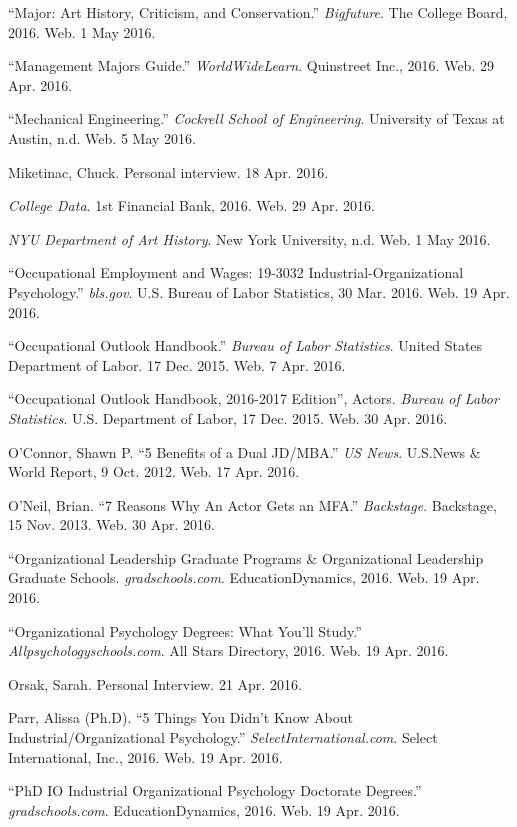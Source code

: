 \begin{workscited}
\begin{flushleft}
\bibent
“Major: Art History, Criticism, and Conservation.” \textit{Bigfuture}. The College Board, 2016. Web. 1 May 2016.

\bibent
“Management Majors Guide.” \textit{WorldWideLearn}. Quinstreet Inc., 2016. Web. 29 Apr. 2016.

\bibent
“Mechanical Engineering.” \textit{Cockrell School of Engineering}. University of Texas at Austin, n.d. Web. 5 May 2016.

\bibent
Miketinac, Chuck. Personal interview. 18 Apr. 2016. 

\bibent
\textit{College Data}. 1st Financial Bank, 2016. Web. 29 Apr. 2016. 

\bibent
\textit{NYU Department of Art History}. New York University, n.d. Web. 1 May 2016.

\bibent
“Occupational Employment and Wages: 19-3032 Industrial-Organizational Psychology.” \textit{bls.gov}. U.S. Bureau of Labor Statistics, 30 Mar. 2016. Web. 19 Apr. 2016. 

\bibent
“Occupational Outlook Handbook.” \textit{Bureau of Labor Statistics}. United States Department of 
Labor. 17 Dec. 2015. Web. 7 Apr. 2016.

\bibent
“Occupational Outlook Handbook, 2016-2017 Edition”, Actors. \textit{Bureau of Labor Statistics}. U.S. Department of Labor, 17 Dec. 2015. Web. 30 Apr. 2016. 

\bibent
O'Connor, Shawn P. “5 Benefits of a Dual JD/MBA.” \textit{US News}. U.S.News \& World Report, 9 Oct. 2012. Web. 17 Apr. 2016.

\bibent
O’Neil, Brian. “7 Reasons Why An Actor Gets an MFA.” \textit{Backstage}. Backstage, 15 Nov. 2013. Web. 30 Apr. 2016. 

\bibent
“Organizational Leadership Graduate Programs \& Organizational Leadership Graduate Schools. \textit{gradschools.com}. EducationDynamics, 2016. Web. 19 Apr. 2016. 

\bibent
“Organizational Psychology Degrees: What You’ll Study.” \textit{Allpsychologyschools.com}. All Stars Directory, 2016. Web. 19 Apr. 2016.

\bibent
Orsak, Sarah. Personal Interview. 21 Apr. 2016.

\bibent
Parr, Alissa (Ph.D). “5 Things You Didn’t Know About Industrial/Organizational Psychology.” \textit{SelectInternational.com}. Select International, Inc., 2016. Web. 19 Apr. 2016.

\bibent
“PhD IO Industrial Organizational Psychology Doctorate Degrees.” \textit{gradschools.com}. EducationDynamics, 2016. Web. 19 Apr. 2016.


\end{flushleft}
\end{workscited}
